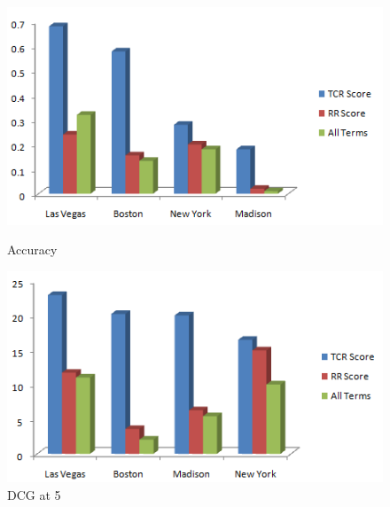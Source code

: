 \documentclass[paper=letter, fontsize=15pt]{article} %
\begin{document}
\begin{figure}[h!]
\begin{minipage}{.5\linewidth}
\centering
\includegraphics[scale=0.6]{Acc.png}
\caption{Accuracy}
\end{minipage}
\begin{minipage}{.5\linewidth}
\includegraphics[scale=0.6]{NDCG.png}
\caption{DCG at 5}
\end{minipage}
\end{figure}
\end{document}
